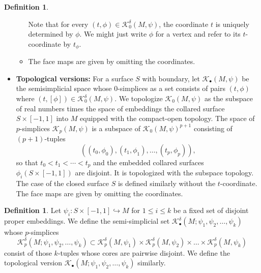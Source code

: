 \documentclass[a4paper]{amsart}
\theoremstyle{definition}
\newtheorem{defn}[thm]{Definition}
\theoremstyle{remark}
\numberwithin{equation}{section}
\begin{document}
\begin{defn}
\begin{itemize}[leftmargin=*]
\begin{itemize}
Note that for every $(t,\phi)\in \mathcal{K}^{\delta}_{0}(M,\psi)$, the coordinate $t$ is uniquely determined by $\phi$. We might just write $\phi$ for a vertex and refer to its $t$-coordinate by $t_{\phi}$.  
\item The face maps are given by omitting the coordinates.

\end{itemize}
\item {\bf Topological versions:} For a surface $S$ with boundary, let $\mathcal{K}_{\bullet}(M,\psi)$  be the semisimplicial space whose $0$-simplices as a set consists of pairs $(t,\phi)$ where $(t,[\phi])\in\mathcal{K}^{\delta}_{0}(M,\psi)$. We topologize $\mathcal{K}_0(M,\psi) $ as the subspace of real numbers times the space of embeddings the collared surface $S\times [-1,1]$ into $M$ equipped with the compact-open topology. The space of $p$-simplices $\mathcal{K}_p(M,\psi)$ is a subspace of  $\mathcal{K}_0(M,\psi)^{p+1}$ consisting of $(p+1)$-tuples $$((t_0,\phi_0), (t_1,\phi_1),\dots, (t_p, \phi_p)),$$ so that $t_0<t_1<\cdots<t_p$ and  the embedded collared surfaces  $\phi_i(S\times [-1,1])$ are disjoint. It is topologized with the subspace topology.  The case of the closed surface $S$ is defined similarly without the $t$-coordinate. The face maps are given by omitting the coordinates.


\end{itemize}
\end{defn}
\begin{defn}
Let  $\psi_i:S\times [-1,1]\hookrightarrow M$ for $1\leq i\leq k$ be a fixed set of disjoint proper embeddings. We define the semi-simplicial set $\mathcal{K}^{\delta}_{\bullet}(M;\psi_1,\psi_2,\dots,\psi_k)$ whose $p$-simplices 
\[\mathcal{K}^{\delta}_{p}(M;\psi_1,\psi_2,\dots,\psi_k)\subset \mathcal{K}^{\delta}_{p}(M,\psi_1)\times \mathcal{K}^{\delta}_{p}(M,\psi_2)\times \dots\times \mathcal{K}^{\delta}_{p}(M,\psi_k)
\]
consist of those $k$-tuples whose cores are pairwise disjoint. We define the topological version $\mathcal{K}_{\bullet}(M;\psi_1,\psi_2,\dots,\psi_k)$ similarly.
\end{defn}
\end{document}
